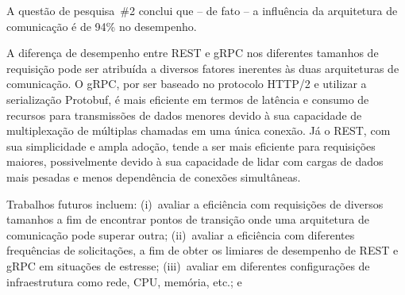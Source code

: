 A questão de pesquisa~\#2 conclui que -- de fato -- a influência da arquitetura de comunicação é de 94\% no desempenho.

A diferença de desempenho entre REST e gRPC nos diferentes tamanhos de requisição pode ser atribuída a diversos fatores inerentes às duas arquiteturas de comunicação. O gRPC, por ser baseado no protocolo HTTP/2 e utilizar a serialização Protobuf, é mais eficiente em termos de latência e consumo de recursos para transmissões de dados menores devido à sua capacidade de multiplexação de múltiplas chamadas em uma única conexão. Já o REST, com sua simplicidade e ampla adoção, tende a ser mais eficiente para requisições maiores, possivelmente devido à sua capacidade de lidar com cargas de dados mais pesadas e menos dependência de conexões simultâneas.

Trabalhos futuros incluem: 
(i)~avaliar a eficiência com requisições de diversos tamanhos a fim de encontrar pontos de transição onde uma arquitetura de comunicação pode superar outra; 
(ii)~avaliar a eficiência com diferentes frequências de solicitações, a fim de obter os limiares de desempenho de REST e gRPC em situações de estresse;
(iii)~avaliar em diferentes configurações de infraestrutura como rede, CPU, memória, etc.; e
